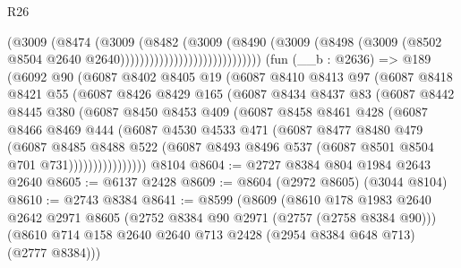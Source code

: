 \begin{lexlean}{R26}
\begin{coremodule}
                                          (@3009
                                            (@8474
                                              (@3009
                                                (@8482
                                                  (@3009
                                                    (@8490
                                                      (@3009
                                                        (@8498
                                                          (@3009
                                                            (@8502
                                                              @8504
                                                              @2640
                                                              @2640)))))))))))))))))))))))))))))
    (fun (__b : @2636) =>
    @189
      (@6092
        @90
        (@6087
          @8402
          @8405
          @19
          (@6087
            @8410
            @8413
            @97
            (@6087
              @8418
              @8421
              @55
              (@6087
                @8426
                @8429
                @165
                (@6087
                  @8434
                  @8437
                  @83
                  (@6087
                    @8442
                    @8445
                    @380
                    (@6087
                      @8450
                      @8453
                      @409
                      (@6087
                        @8458
                        @8461
                        @428
                        (@6087
                          @8466
                          @8469
                          @444
                          (@6087
                            @4530
                            @4533
                            @471
                            (@6087
                              @8477
                              @8480
                              @479
                              (@6087
                                @8485
                                @8488
                                @522
                                (@6087 @8493 @8496 @537 (@6087 @8501 @8504 @701 @731))))))))))))))))
    @8104
@8604 := @2727 @8384 @804 @1984 @2643 @2640
@8605 := @6137 @2428
@8609 := @8604 (@2972 @8605) (@3044 @8104)
@8610 := @2743 @8384
@8641 := @8599
    (@8609
      (@8610
        @178
        @1983
        @2640
        @2642
        @2971
        @8605
        (@2752 @8384 @90 @2971 (@2757 (@2758 @8384 @90)))
        (@8610 @714 @158 @2640 @2640 @713 @2428 (@2954 @8384 @648 @713) (@2777 @8384)))

\end{coremodule}
\end{lexlean}
